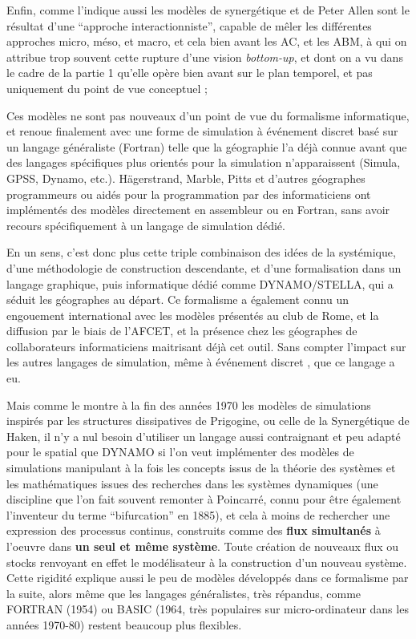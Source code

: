Enfin, comme l'indique aussi \textcites[850]{Sanders2013}{Pumain2013} les modèles de synergétique et de Peter Allen sont le résultat d'une \enquote{approche interactionniste}, capable de mêler les différentes approches micro, méso, et macro, et cela bien avant les AC, et les ABM, à qui on attribue trop souvent cette rupture d'une vision \textit{bottom-up}, et dont on a vu dans le cadre de la partie 1 qu'elle opère bien avant sur le plan temporel, et pas uniquement du point de vue conceptuel \autocites{Orcutt1957, Hagerstrand1967, Ward1973, Doran1970};

Ces modèles ne sont pas nouveaux d'un point de vue du formalisme informatique, et renoue finalement avec une forme de simulation à événement discret basé sur un langage généraliste (Fortran) telle que la géographie l'a déjà connue avant que des langages spécifiques plus orientés pour la simulation n'apparaissent (Simula, GPSS, Dynamo, etc.). Hägerstrand, Marble, Pitts et d'autres géographes programmeurs ou aidés pour la programmation par des informaticiens ont implémentés des modèles directement en assembleur ou en Fortran, sans avoir recours spécifiquement à un langage de simulation dédié.

En un sens, c'est donc plus cette triple combinaison des idées de la systémique, d'une méthodologie de construction descendante, et d'une formalisation dans un langage graphique, puis informatique dédié comme DYNAMO/STELLA, qui a séduit les géographes au départ. Ce formalisme a également connu un engouement international avec les modèles présentés au club de Rome, et la diffusion par le biais de l'AFCET, et la présence chez les géographes de collaborateurs informaticiens maitrisant déjà cet outil. Sans compter l'impact sur les autres langages de simulation, même à événement discret \autocite{Nance1993}, que ce langage a eu.

Mais comme le montre à la fin des années 1970 les modèles de simulations inspirés par les structures dissipatives de Prigogine, ou celle de la Synergétique de Haken, il n'y a nul besoin d'utiliser un langage aussi contraignant et peu adapté pour le spatial que DYNAMO si l'on veut implémenter des modèles de simulations manipulant à la fois les concepts issus de la théorie des systèmes et les mathématiques issues des recherches dans les systèmes dynamiques (une discipline que l'on fait souvent remonter à Poincarré, connu pour être également l'inventeur du terme \enquote{bifurcation} en 1885), et cela à moins de rechercher une expression des processus continus, construits comme des \textbf{flux simultanés} à l'oeuvre dans \textbf{un seul et même système}. Toute création de nouveaux flux ou stocks renvoyant en effet le modélisateur à la construction d'un nouveau système. Cette rigidité explique aussi le peu de modèles développés dans ce formalisme par la suite, alors même que les langages généralistes, très répandus, comme FORTRAN (1954) ou BASIC (1964, très populaires sur micro-ordinateur dans les années 1970-80) restent beaucoup plus flexibles. %

